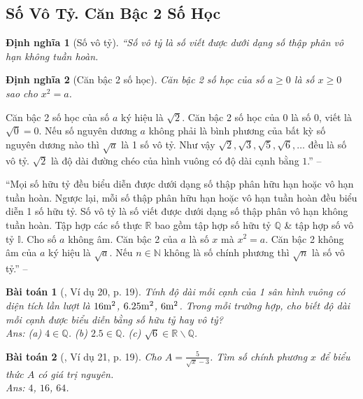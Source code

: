 \documentclass{article}
\numberwithin{equation}{section}
\newtheorem{dinhnghia}{Định nghĩa}[section]
\newtheorem{baitoan}{Bài toán}
\begin{document}
\subsection{Số Vô Tỷ. Căn Bậc 2 Số Học}

\begin{dinhnghia}[Số vô tỷ]
	``\emph{Số vô tỷ} là số viết được dưới dạng số thập phân vô hạn không tuần hoàn.
\end{dinhnghia}

\begin{dinhnghia}[Căn bậc 2 số học]
	\emph{Căn bậc 2 số học} của số $a\ge 0$ là số $x\ge 0$ sao cho $x^2 = a$.
\end{dinhnghia}
Căn bậc 2 số học của số $a$ ký hiệu là $\sqrt{2}$. Căn bậc 2 số học của $0$ là số $0$, viết là $\sqrt{0} = 0$. Nếu số nguyên dương $a$ không phải là bình phương của bất kỳ số nguyên dương nào thì $\sqrt{a}$ là 1 số vô tỷ. Như vậy $\sqrt{2},\sqrt{3},\sqrt{5},\sqrt{6},\ldots$ đều là số vô tỷ. $\sqrt{2}$ là độ dài đường chéo của hình vuông có độ dài cạnh bằng $1$.'' -- \cite[Chap. 2, \S1, p. 19]{Tuyen_Toan_7}

``Mọi số hữu tỷ đều biểu diễn được dưới dạng số thập phân hữu hạn hoặc vô hạn tuần hoàn. Ngược lại, mỗi số thập phân hữu hạn hoặc vô hạn tuần hoàn đều biểu diễn 1 số hữu tỷ. Số vô tỷ là số viết được dưới dạng số thập phân vô hạn không tuần hoàn. Tập hợp các số thực $\mathbb{R}$ bao gồm tập hợp số hữu tỷ $\mathbb{Q}$ \& tập hợp số vô tỷ $\mathbb{I}$. Cho số $a$ không âm. Căn bậc 2 của $a$ là số $x$ mà $x^2 = a$. Căn bậc 2 không âm của $a$ ký hiệu là $\sqrt{a}$. Nếu $n\in\mathbb{N}$ không là số chính phương thì $\sqrt{n}$ là số vô tỷ.'' -- \cite[\S7]{Binh_Toan_7_tap_1}

\begin{baitoan}[\cite{Tuyen_Toan_7}, Ví dụ 20, p. 19]
	Tính độ dài mỗi cạnh của 1 sân hình vuông có diện tích lần lượt là $\rm16m^2$, $\rm6.25m^2$, $\rm6m^2$. Trong mỗi trường hợp, cho biết độ dài mỗi cạnh được biểu diễn bằng số hữu tỷ hay vô tỷ?\\\mbox{}\hfill\textsf{Ans:} (a) $4\in\mathbb{Q}$. (b) $2.5\in\mathbb{Q}$. (c) $\sqrt{6}\in\mathbb{R}\backslash\mathbb{Q}$.
\end{baitoan}

\begin{baitoan}[\cite{Tuyen_Toan_7}, Ví dụ 21, p. 19]
	Cho $A = \frac{5}{\sqrt{x} - 3}$. Tìm số chính phương $x$ để biểu thức $A$ có giá trị nguyên.\\\mbox{}\hfill\textsf{Ans:} $4$, $16$, $64$.
\end{baitoan}
\end{document}
